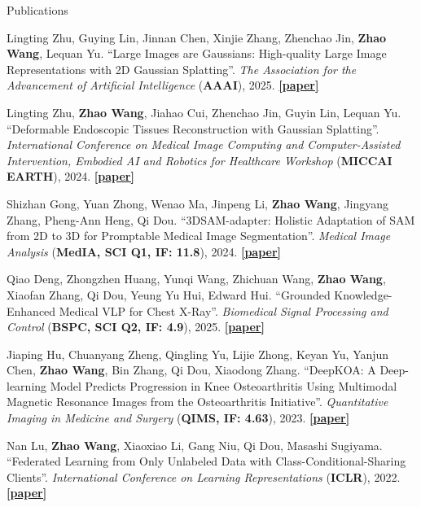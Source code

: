 \documentclass[a4paper]{resume} %
\begin{document}
\begin{rSection}{Publications}
\begin{enumerate}[label={[\arabic*]}, topsep=0em, leftmargin=1.4em, itemsep=-0.5em]
\item Lingting Zhu, Guying Lin, Jinnan Chen, Xinjie Zhang, Zhenchao Jin, {\bf Zhao Wang}, Lequan Yu. “Large Images are Gaussians: High-quality Large Image Representations with 2D Gaussian Splatting”. {\it The Association for the Advancement of Artificial Intelligence} ({\bf AAAI}), 2025. \href{https://arxiv.org/abs/2502.09039}{\bf [paper]}

\item Lingting Zhu, {\bf Zhao Wang}, Jiahao Cui, Zhenchao Jin, Guyin Lin, Lequan Yu. “Deformable Endoscopic Tissues Reconstruction with Gaussian Splatting”. {\it International Conference on Medical Image Computing and Computer-Assisted Intervention, Embodied AI and Robotics for Healthcare Workshop} ({\bf MICCAI EARTH}), 2024. \href{https://arxiv.org/abs/2401.11535}{\bf [paper]}


\item Shizhan Gong, Yuan Zhong, Wenao Ma, Jinpeng Li, {\bf Zhao Wang}, Jingyang Zhang, Pheng-Ann Heng, Qi Dou. “3DSAM-adapter: Holistic Adaptation of SAM from 2D to 3D for Promptable Medical Image Segmentation”. {\it Medical Image Analysis} ({\bf MedIA, SCI Q1, IF: 11.8}), 2024. \href{https://arxiv.org/abs/2306.13465}{\bf [paper]}


\item Qiao Deng, Zhongzhen Huang, Yunqi Wang, Zhichuan Wang, {\bf Zhao Wang}, Xiaofan Zhang, Qi Dou, Yeung Yu Hui, Edward Hui. “Grounded Knowledge-Enhanced Medical VLP for Chest X-Ray”. {\it Biomedical Signal Processing and Control} ({\bf BSPC, SCI Q2, IF: 4.9}),  2025. \href{https://arxiv.org/abs/2404.14750}{\bf [paper]}


\item Jiaping Hu, Chuanyang Zheng, Qingling Yu, Lijie Zhong, Keyan Yu, Yanjun Chen, {\bf Zhao Wang}, Bin Zhang, Qi Dou, Xiaodong Zhang. “DeepKOA: A Deep-learning Model Predicts Progression in Knee Osteoarthritis Using Multimodal Magnetic Resonance Images from the Osteoarthritis Initiative”. {\it Quantitative Imaging in Medicine and Surgery} ({\bf QIMS, IF: 4.63}), 2023. \href{https://qims.amegroups.com/article/view/114391}{\bf [paper]}

\item Nan Lu, {\bf Zhao Wang}, Xiaoxiao Li, Gang Niu, Qi Dou, Masashi Sugiyama. “Federated Learning from Only Unlabeled Data with Class-Conditional-Sharing Clients”. {\it International Conference on Learning Representations} ({\bf ICLR}), 2022. \href{https://openreview.net/forum?id=WHA8009laxu}{\bf [paper]}






\end{enumerate}
\end{rSection}
\end{document}
